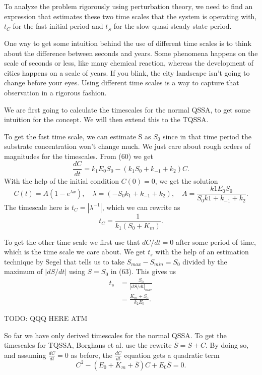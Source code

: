 \documentclass[12pt]{article}
\begin{document}
To analyze the problem rigorously using perturbation theory, we need
to find an expression that estimates these two time scales that the
system is operating with, $t_C$ for the fast initial period and
$t_{\overline{S}}$ for the slow quasi-steady state period.

One way to get some intuition behind the use of different time scales
is to think about the difference between seconds and years. Some
phenomena happens on the scale of seconds or less, like many chemical
reaction, whereas the development of cities happens on a scale of
years. If you blink, the city landscape isn't going to change before
your eyes. Using different time scales is a way to capture that
observation in a rigorous fashion.

We are first going to calculate the timescales for the normal QSSA, to
get some intuition for the concept. We will then extend this to the
TQSSA.

To get the fast time scale, we can estimate S as $S_0$ since in that
time period the substrate concentration won't change much. We just
care about rough orders of magnitudes for the timescales. From (60) we
get
\begin{equation}
  \frac{dC}{dt} = k_1E_0 S_0 - (k_1 S_0 + k_{-1} + k_2)C.
\end{equation}
With the help of the initial condition $C(0)=0$, we get the solution
\begin{equation}
  C(t) = A(1 -  e^{\lambda x}), \quad
  \lambda = (-S_0 k_1 + k_{-1} + k_2), \quad
  A =\frac{k1 E_0 S_0}{S_0 k1 + k_{-1} + k_2}.
\end{equation}
The timescale here is $t_C = |\lambda^{-1}|$, which we can rewrite as
\begin{equation}
  t_C = \frac{1}{k_1(S_0+K_m)}.
\end{equation}

To get the other time scale we first use that $dC/dt = 0$ after some
period of time, which is the time scale we care about. We get $t_s$
with the help of an estimation technique by Segel
\cite{segel1984modeling} that tells us to take
$S_{max} - S_{min} = S_0$ divided by the maximum of $|dS/dt|$ using
$S=S_0$ in (63). This gives us
\begin{align}
  t_s &= \frac{S_0}{|dS/dt|_{max}} \\
      &= \frac{K_m + S_0}{k_2 E_0}.
\end{align}

TODO: QQQ HERE ATM

So far we have only derived timescales for the normal QSSA. To get the
timescales for TQSSA, Borghans et al. use the rewrite
$\overline{S} = S + C$. By doing so, and assuming $\frac{dC}{dt}=0$ as
before, the $\frac{dC}{dt}$ equation gets a quadratic term
\begin{equation}
  C^2 - (E_0 + K_m + \overline{S})C + E_0 \overline{S} = 0.
\end{equation}
\end{document}

